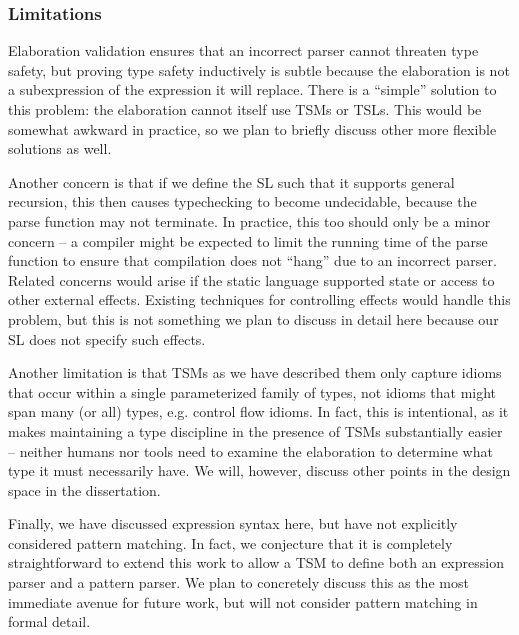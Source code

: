 \subsubsection{Limitations}\label{sec:tsms-limitations}
Elaboration validation ensures that an incorrect parser cannot threaten type safety, but proving type safety inductively is subtle because the elaboration is not a subexpression of the expression it will replace. There is a ``simple'' solution to this problem: the elaboration cannot itself use TSMs or TSLs. This would be somewhat awkward in practice, so we plan to briefly discuss other more flexible solutions as well.  

Another concern is that if we define the SL such that it supports general recursion, this then causes typechecking to become undecidable, because the parse function may not terminate. In practice, this too should only be a minor concern -- a compiler might be expected to limit the running time of the parse function to ensure that compilation does not ``hang'' due to an incorrect parser. Related concerns would arise if the static language supported state or access to other external effects. Existing techniques for controlling effects would handle this problem, but this is not something we plan to discuss in detail here because our SL does not specify such effects.

Another limitation is that TSMs as we have described them only capture idioms that occur within a single parameterized family of types,  not idioms that might span many (or all) types, e.g. control flow idioms. In fact, this is intentional, as it makes maintaining a type discipline in the presence of TSMs substantially easier -- neither humans nor tools need to examine the elaboration to determine what type it must necessarily have. We will, however, discuss other points in the design space in the dissertation.

Finally, we have discussed expression syntax here, but have not explicitly considered pattern matching. In fact, we conjecture that it is completely straightforward to extend this work to allow a TSM to define both an expression parser and a pattern parser. We plan to concretely discuss this as the most immediate avenue for future work, but will not consider pattern matching in formal detail.

